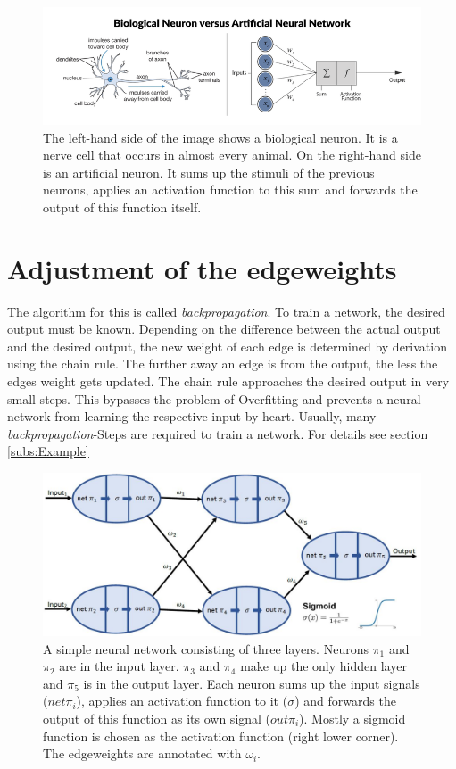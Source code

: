 \begin{figure}[h]
	\centering
	\includegraphics[width=1\linewidth]{Figures/chap1/bio_vs_arti_neuron.png}
	\caption[Caption for LOF]{The left-hand side of the image \footnotemark shows a biological neuron. It is a nerve cell that occurs in almost every animal. On the right-hand side is an artificial neuron. It sums up the stimuli of the previous neurons, applies an activation function to this sum and forwards the output of this function itself.}
	\label{fig:test1}
\end{figure}


\section{Adjustment of the edgeweights}
The algorithm for this is called \textit{backpropagation}. To train a network, the desired output must be known. Depending on the difference between the actual output and the desired output, the new weight of each edge is determined by derivation using the chain rule. The further away an edge is from the output, the less the edges weight gets updated. The chain rule approaches the desired output in very small steps. This bypasses the problem of Overfitting and prevents a neural network from learning the respective input by heart. Usually, many \textit{backpropagation}-Steps are required to train a network. For details see section \ref{subs:Example}


\begin{figure}[h]
	\centering
	\includegraphics[width=1\linewidth]{Figures/chap1/backpropagation_example.JPG}
	\caption{A simple neural network consisting of three layers. Neurons $\pi_1$ and $\pi_2$ are in the input layer. $\pi_3$ and $\pi_4$ make up the only hidden layer and $\pi_5$ is in the output layer. Each neuron sums up the input signals ($net\pi_i$), applies an activation function to it ($\sigma$) and forwards the output of this function as its own signal ($out\pi_i$). Mostly a sigmoid function is chosen as the activation function (right lower corner). The edgeweights are annotated with $\omega_i$.}
	\label{fig:backpropagation}
\end{figure}

